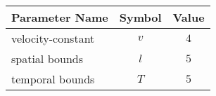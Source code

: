 \begin{tabular}{lcc}
\hline
 Parameter Name    &  Symbol  &  Value  \\
\hline
 velocity-constant &   $v$    &   $4$   \\
 spatial bounds    &   $l$    &   $5$   \\
 temporal bounds   &   $T$    &   $5$   \\
\hline
\end{tabular}